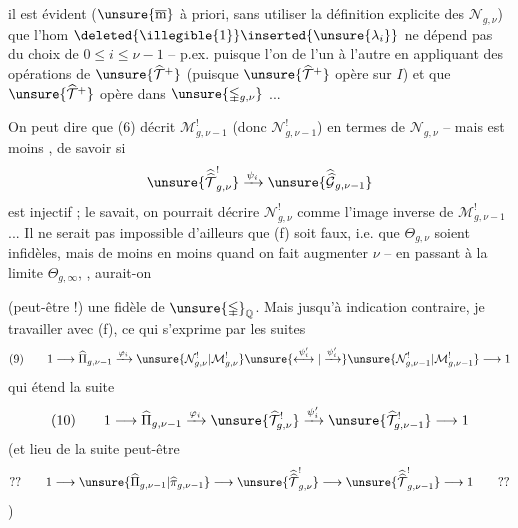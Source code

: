 
il est évident  ($\unsure{\overline{\mathrm m}}$ à priori, sans utiliser la définition  explicite des $\mathcal N_{g,\nu}$) que l'hom $\deleted{\illegible{1}}\inserted{\unsure{\lambda_i}}$  ne dépend pas du choix de $0\leq i\leq\nu-1$ -- p.ex. puisque l'on  de l'un à l'autre en appliquant des opérations de $\unsure{\widehat{\mathcal T}^{+}}$ (puisque $\unsure{\widehat{\mathcal T}^{+}}$ opère  sur $I$) et que $\unsure{\widehat{\mathcal T}^{+}}$ opère  dans $\unsure{\mathbb{\Gamma}_{g,\nu}}$ ...

On peut dire que (6) décrit $\mathcal M_{g,\nu-1}^{!}$ (donc $\mathcal N_{g,\nu-1}^{!}$) en termes de $\mathcal N_{g,\nu}$ -- mais  est moins ,  de savoir si
\[
\unsure{\widehat{\widehat{\mathcal T}}_{g,\nu}^{!}}
\xrightarrow{\psi_i}
\unsure{\widehat{\widehat{\mathcal G}}_{g,\nu-1}}
\]
est injectif ;  le savait, on pourrait décrire $\mathcal N_{g,\nu}^{!}$ comme l'image inverse de $\mathcal M_{g,\nu-1}^{!}$ ...  Il ne serait pas impossible d'ailleurs que (f) soit faux, i.e. que  $\Theta_{g,\nu}$ soient infidèles, mais de moins en moins quand on fait augmenter $\nu$ -- en passant à la limite  $\Theta_{g,\infty}$, , aurait-on


(peut-être !) une  fidèle de $\unsure{\mathbb{\Gamma}}_{\mathbb Q}$. Mais jusqu'à indication contraire, je  travailler  avec (f), ce qui s'exprime par les suites  
\[
(9)\qquad
1\longrightarrow\widehat{\Pi}_{g,\nu-1}
\xrightarrow{\varphi_i}
\unsure{\mathcal N_{g,\nu}^{!}|\mathcal M_{g,\nu}^{!}}
\unsure{\overset{\psi_i'}{\longleftrightarrow}|\xrightarrow{\psi_i'}}
\unsure{\mathcal N_{g,\nu-1}^{!}|\mathcal M_{g,\nu-1}^{!}}
\longrightarrow1
\]
qui étend la suite 
\[
(10)\qquad
1\longrightarrow\widehat{\Pi}_{g,\nu-1}
\xrightarrow{\varphi_i}
\unsure{\widehat{\mathcal T}_{g,\nu}^{!}}
\xrightarrow{\psi_i'}
\unsure{\widehat{\mathcal T}_{g,\nu-1}^{!}}
\longrightarrow1
\]
(et  lieu de la suite  peut-être 
\[
??\qquad
1\longrightarrow\unsure{\widehat{\Pi}_{g,\nu-1}|\widehat{\pi}_{g,\nu-1}}
\longrightarrow\unsure{\widehat{\widehat{\mathcal T}}_{g,\nu}^{!}}
\longrightarrow\unsure{\widehat{\widehat{\mathcal T}}_{g,\nu-1}^{!}}
\longrightarrow1
\qquad??
\]
)

